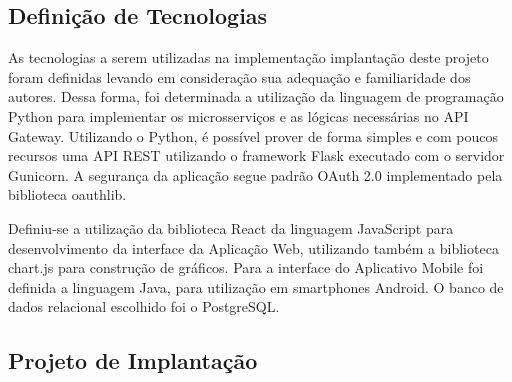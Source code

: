 \subsection{Definição de Tecnologias}

As tecnologias a serem utilizadas na implementação implantação deste projeto foram definidas levando em consideração sua adequação e familiaridade dos autores. Dessa forma, foi determinada a utilização da linguagem de programação Python para implementar os microsserviços e as lógicas necessárias no API Gateway. Utilizando o Python, é possível prover de forma simples e com poucos recursos uma API REST utilizando o framework Flask executado com o servidor Gunicorn. A segurança da aplicação segue padrão OAuth 2.0 implementado pela biblioteca oauthlib.

Definiu-se a utilização da biblioteca React da linguagem JavaScript para desenvolvimento da interface da Aplicação Web, utilizando também a biblioteca chart.js para construção de gráficos. Para a interface do Aplicativo Mobile foi definida a linguagem Java, para utilização em smartphones Android. O banco de dados relacional escolhido foi o PostgreSQL. 


\subsection{Projeto de Implantação}


